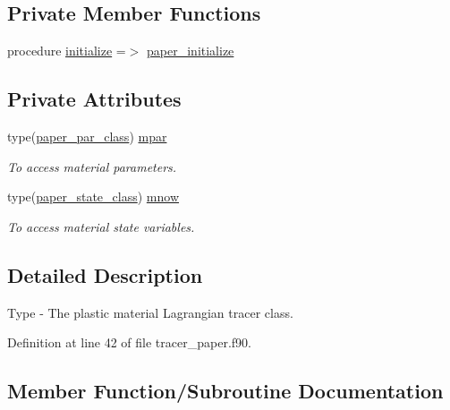\subsection*{Private Member Functions}
\begin{DoxyCompactItemize}
\item 
procedure \mbox{\hyperlink{structtracer__paper__mod_1_1paper__class_ab90f274e3855ef0bbca07bf477c745f9}{initialize}} =$>$ \mbox{\hyperlink{namespacetracer__paper__mod_a4e3b16f967d34cd206499188e17ac4f2}{paper\+\_\+initialize}}
\end{DoxyCompactItemize}
\subsection*{Private Attributes}
\begin{DoxyCompactItemize}
\item 
type(\mbox{\hyperlink{structtracer__paper__mod_1_1paper__par__class}{paper\+\_\+par\+\_\+class}}) \mbox{\hyperlink{structtracer__paper__mod_1_1paper__class_a23ace4a6e578ffccaf1d5dcd91dc09b3}{mpar}}
\begin{DoxyCompactList}\small\item\em To access material parameters. \end{DoxyCompactList}\item 
type(\mbox{\hyperlink{structtracer__paper__mod_1_1paper__state__class}{paper\+\_\+state\+\_\+class}}) \mbox{\hyperlink{structtracer__paper__mod_1_1paper__class_a7156f27ec83059ac3b701502a4320858}{mnow}}
\begin{DoxyCompactList}\small\item\em To access material state variables. \end{DoxyCompactList}\end{DoxyCompactItemize}


\subsection{Detailed Description}
Type -\/ The plastic material Lagrangian tracer class. 

Definition at line 42 of file tracer\+\_\+paper.\+f90.



\subsection{Member Function/\+Subroutine Documentation}
\mbox{\label{structtracer__paper__mod_1_1paper__class_ab90f274e3855ef0bbca07bf477c745f9}} 
